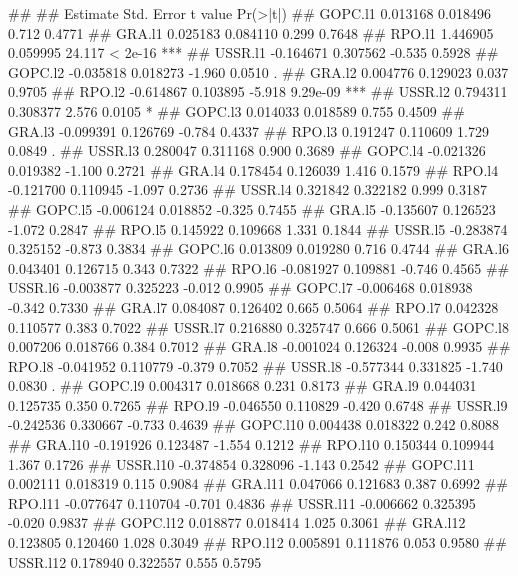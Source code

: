 \documentclass[
]{article}
\begin{document}
\begin{itemize}
## 
##           Estimate Std. Error t value Pr(>|t|)    
## GOPC.l1   0.013168   0.018496   0.712   0.4771    
## GRA.l1    0.025183   0.084110   0.299   0.7648    
## RPO.l1    1.446905   0.059995  24.117  < 2e-16 ***
## USSR.l1  -0.164671   0.307562  -0.535   0.5928    
## GOPC.l2  -0.035818   0.018273  -1.960   0.0510 .  
## GRA.l2    0.004776   0.129023   0.037   0.9705    
## RPO.l2   -0.614867   0.103895  -5.918 9.29e-09 ***
## USSR.l2   0.794311   0.308377   2.576   0.0105 *  
## GOPC.l3   0.014033   0.018589   0.755   0.4509    
## GRA.l3   -0.099391   0.126769  -0.784   0.4337    
## RPO.l3    0.191247   0.110609   1.729   0.0849 .  
## USSR.l3   0.280047   0.311168   0.900   0.3689    
## GOPC.l4  -0.021326   0.019382  -1.100   0.2721    
## GRA.l4    0.178454   0.126039   1.416   0.1579    
## RPO.l4   -0.121700   0.110945  -1.097   0.2736    
## USSR.l4   0.321842   0.322182   0.999   0.3187    
## GOPC.l5  -0.006124   0.018852  -0.325   0.7455    
## GRA.l5   -0.135607   0.126523  -1.072   0.2847    
## RPO.l5    0.145922   0.109668   1.331   0.1844    
## USSR.l5  -0.283874   0.325152  -0.873   0.3834    
## GOPC.l6   0.013809   0.019280   0.716   0.4744    
## GRA.l6    0.043401   0.126715   0.343   0.7322    
## RPO.l6   -0.081927   0.109881  -0.746   0.4565    
## USSR.l6  -0.003877   0.325223  -0.012   0.9905    
## GOPC.l7  -0.006468   0.018938  -0.342   0.7330    
## GRA.l7    0.084087   0.126402   0.665   0.5064    
## RPO.l7    0.042328   0.110577   0.383   0.7022    
## USSR.l7   0.216880   0.325747   0.666   0.5061    
## GOPC.l8   0.007206   0.018766   0.384   0.7012    
## GRA.l8   -0.001024   0.126324  -0.008   0.9935    
## RPO.l8   -0.041952   0.110779  -0.379   0.7052    
## USSR.l8  -0.577344   0.331825  -1.740   0.0830 .  
## GOPC.l9   0.004317   0.018668   0.231   0.8173    
## GRA.l9    0.044031   0.125735   0.350   0.7265    
## RPO.l9   -0.046550   0.110829  -0.420   0.6748    
## USSR.l9  -0.242536   0.330667  -0.733   0.4639    
## GOPC.l10  0.004438   0.018322   0.242   0.8088    
## GRA.l10  -0.191926   0.123487  -1.554   0.1212    
## RPO.l10   0.150344   0.109944   1.367   0.1726    
## USSR.l10 -0.374854   0.328096  -1.143   0.2542    
## GOPC.l11  0.002111   0.018319   0.115   0.9084    
## GRA.l11   0.047066   0.121683   0.387   0.6992    
## RPO.l11  -0.077647   0.110704  -0.701   0.4836    
## USSR.l11 -0.006662   0.325395  -0.020   0.9837    
## GOPC.l12  0.018877   0.018414   1.025   0.3061    
## GRA.l12   0.123805   0.120460   1.028   0.3049    
## RPO.l12   0.005891   0.111876   0.053   0.9580    
## USSR.l12  0.178940   0.322557   0.555   0.5795    

\end{itemize}
\end{document}
